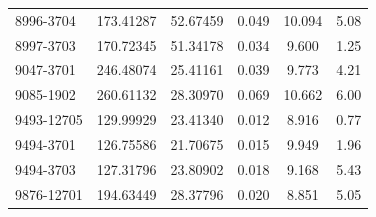 \begin{table}
\begin{tabular}{lccccc}
8996-3704 & 173.41287 & 52.67459 & 0.049 & 10.094 & 5.08 \\
8997-3703 & 170.72345 & 51.34178 & 0.034 & 9.600 & 1.25 \\
9047-3701 & 246.48074 & 25.41161 & 0.039 & 9.773 & 4.21 \\
9085-1902 & 260.61132 & 28.30970 & 0.069 & 10.662 & 6.00 \\
9493-12705 & 129.99929 & 23.41340 & 0.012 & 8.916 & 0.77 \\
9494-3701 & 126.75586 & 21.70675 & 0.015 & 9.949 & 1.96 \\
9494-3703 & 127.31796 & 23.80902 & 0.018 & 9.168 & 5.43 \\
9876-12701 & 194.63449 & 28.37796 & 0.020 & 8.851 & 5.05 \\
\hline
\end{tabular}
\end{table}

